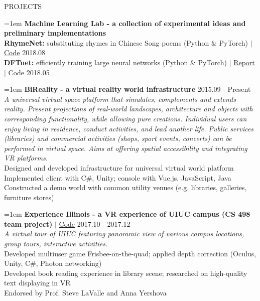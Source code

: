 \documentclass[10pt]{article}
\begin{document}
\vspace{1em}
{\LARGE PROJECTS}

\hangindent=1em
\textbf{Machine Learning Lab - a collection of experimental ideas and preliminary implementations} \\
\textbf{RhymeNet:} substituting rhymes in Chinese Song poems (Python \& PyTorch) $|$ \href{https://github.com/liujch1998/Lab/tree/master/ml-songci}{Code} \hfill 2018.08 \\
\textbf{DFTnet:} efficiently training large neural networks (Python \& PyTorch) $|$ \href{https://github.com/liujch1998/Lab/blob/master/ml-dft-nn/report/report.pdf}{Report} $|$ \href{https://github.com/liujch1998/Lab/tree/master/ml-dft-nn}{Code} \hfill 2018.05

\hangindent=1em
\textbf{BiReality - a virtual reality world infrastructure} \hfill 2015.09 - Present \\
\textit{A universal virtual space platform that simulates, complements and extends reality. Present projections of real-world landscapes, architecture and objects with corresponding functionality, while allowing pure creations. Individual users can enjoy living in residence, conduct activities, and lead another life. Public services (libraries) and commercial activities (shops, sport events, concerts) can be performed in virtual space. Aims at offering spatial accessibility and integrating VR platforms.} \\
Designed and developed infrastructure for universal virtual world platform \\
Implemented client with C\#, Unity; console with Vue.js, JavaScript, Java \\
Constructed a demo world with common utility venues (e.g. libraries, galleries, furniture stores)

\hangindent=1em
\textbf{Experience Illinois - a VR experience of UIUC campus (CS 498 team project)} $|$ \href{https://github.com/liujch1998/Illinois-Experience}{Code} \hfill 2017.10 - 2017.12 \\
\textit{A virtual tour of UIUC featuring panoramic view of various campus locations, group tours, interactive activities. } \\
Developed multiuser game Frisbee-on-the-quad; applied depth correction (Oculus, Unity, C\#, Photon networking) \\
Developed book reading experience in library scene; researched on high-quality text displaying in VR \\
Endorsed by Prof. Steve LaValle and Anna Yershova
\end{document}
